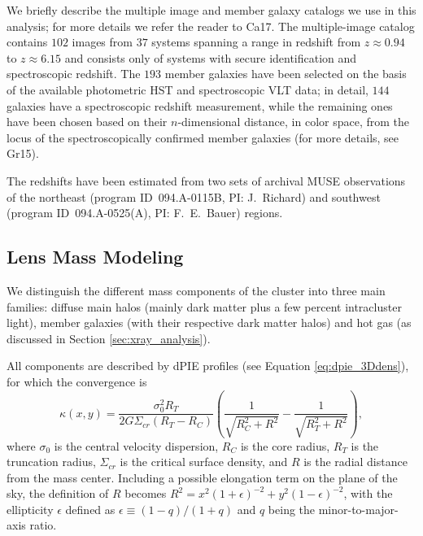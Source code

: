 \documentclass[twocolumn]{aastex61}
\begin{document}
We briefly describe the multiple image and member galaxy catalogs we use in
this analysis; for more details we refer the reader to Ca17.
The multiple-image catalog contains $102$ images from $37$
systems spanning a range in redshift from $z\approx 0.94$ to $z\approx 6.15$ and
consists only of systems with secure identification \citep{Balestra2016,Caminha2016a}
and spectroscopic redshift.
The $193$ member galaxies have been selected on the basis of the available
photometric HST and spectroscopic VLT data; in detail, $144$ galaxies have a
spectroscopic redshift measurement, while the remaining ones have been chosen
based on their $n$-dimensional distance, in color space, from the locus of the
spectroscopically confirmed member galaxies (for more details, see Gr15).

The redshifts have been estimated from two sets of archival MUSE observations of
the northeast (program ID~094.A-0115B, PI: J.~Richard) and southwest (program
ID~094.A-0525(A), PI: F.~E.~Bauer) regions.


\subsection{Lens Mass Modeling}\label{sec:lens_model}
We distinguish the different mass components of the cluster into three main families:
diffuse main halos (mainly dark matter plus a few percent intracluster light),
member galaxies (with their respective dark matter halos) and hot gas (as discussed in Section
\ref{sec:xray_analysis}).

All components are described by dPIE profiles (see Equation
\ref{eq:dpie_3Ddens}), for which the convergence is
\begin{equation}
\kappa(x,y) = \frac{\sigma_0^2 R_T}{ 2 G \Sigma_{cr} \left( R_T - R_C \right) }
\left( \frac{1}{ \sqrt{ R_C^2 + R^2 } } - \frac{1}{ \sqrt{ R_T^2 + R^2 } } \right),
\label{eq:dpie_kappa}
\end{equation}
where $\sigma_0$ is the central velocity dispersion, $R_C$ is the core radius,
$R_T$ is the truncation radius, $\Sigma_{cr}$ is the critical surface density,
and $R$ is the radial distance from the mass center.
Including a possible elongation term on the plane of the sky, the definition of
$R$ becomes $R^2 = x^2 ( 1 + \epsilon )^{-2} + y^2 ( 1 - \epsilon )^{-2}$,
with the ellipticity $\epsilon$ defined as $\epsilon \equiv ( 1 - q )/( 1 + q )$
and $q$ being the minor-to-major-axis ratio.
\end{document}
